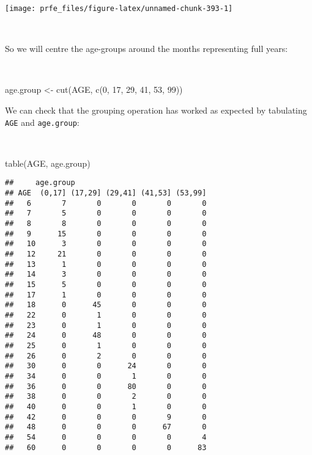 \documentclass[
  12pt,
  a4paper]{book}
\newenvironment{Shaded}{\begin{snugshade}}{\end{snugshade}}
\newcommand{\DecValTok}[1]{\textcolor[rgb]{0.00,0.00,0.81}{#1}}
\newcommand{\FunctionTok}[1]{\textcolor[rgb]{0.00,0.00,0.00}{#1}}
\newcommand{\NormalTok}[1]{#1}
\newcommand{\OtherTok}[1]{\textcolor[rgb]{0.56,0.35,0.01}{#1}}
\begin{document}
\begin{center}\texttt{[image: prfe\_files/figure-latex/unnamed-chunk-393-1]} \end{center}

~

So we will centre the age-groups around the months representing full years:

~

\begin{Shaded}
\begin{Highlighting}[]
\NormalTok{age.group }\OtherTok{\textless{}{-}} \FunctionTok{cut}\NormalTok{(AGE, }\FunctionTok{c}\NormalTok{(}\DecValTok{0}\NormalTok{, }\DecValTok{17}\NormalTok{, }\DecValTok{29}\NormalTok{, }\DecValTok{41}\NormalTok{, }\DecValTok{53}\NormalTok{, }\DecValTok{99}\NormalTok{))}
\end{Highlighting}
\end{Shaded}

\newpage

We can check that the grouping operation has worked as expected by tabulating \texttt{AGE} and \texttt{age.group}:

~

\begin{Shaded}
\begin{Highlighting}[]
\FunctionTok{table}\NormalTok{(AGE, age.group)}
\end{Highlighting}
\end{Shaded}

\begin{verbatim}
##     age.group
## AGE  (0,17] (17,29] (29,41] (41,53] (53,99]
##   6       7       0       0       0       0
##   7       5       0       0       0       0
##   8       8       0       0       0       0
##   9      15       0       0       0       0
##   10      3       0       0       0       0
##   12     21       0       0       0       0
##   13      1       0       0       0       0
##   14      3       0       0       0       0
##   15      5       0       0       0       0
##   17      1       0       0       0       0
##   18      0      45       0       0       0
##   22      0       1       0       0       0
##   23      0       1       0       0       0
##   24      0      48       0       0       0
##   25      0       1       0       0       0
##   26      0       2       0       0       0
##   30      0       0      24       0       0
##   34      0       0       1       0       0
##   36      0       0      80       0       0
##   38      0       0       2       0       0
##   40      0       0       1       0       0
##   42      0       0       0       9       0
##   48      0       0       0      67       0
##   54      0       0       0       0       4
##   60      0       0       0       0      83
\end{verbatim}
\end{document}
